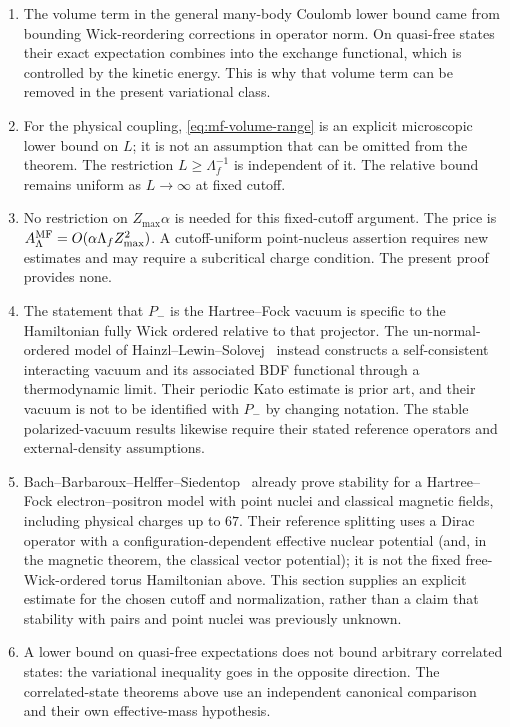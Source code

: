 \begin{remark}
\label{rem:mf-scope}
\begin{enumerate}[label=(\alph*)]
\item The volume term in the general many-body Coulomb lower bound came
from bounding Wick-reordering corrections in operator norm.  On quasi-free
states their exact expectation combines into the exchange functional,
which is controlled by the kinetic energy.  This is why that volume term
can be removed in the present variational class.
\item For the physical coupling, \eqref{eq:mf-volume-range} is an explicit
microscopic lower bound on $L$; it is not an assumption that can be omitted
from the theorem.  The restriction $L\ge\Lambda_f^{-1}$ is independent of
it.  The relative bound remains uniform as $L\to\infty$ at fixed cutoff.
\item No restriction on $Z_{\max}\alpha$ is needed for this fixed-cutoff
argument.  The price is $A^{\rm MF}_\Lambda=O(\alpha\Lambda_fZ_{\max}^2)$.
A cutoff-uniform point-nucleus assertion requires new estimates and may
require a subcritical charge condition.  The present proof provides none.
\item The statement that $P_-$ is the Hartree--Fock vacuum is specific to
the Hamiltonian fully Wick ordered relative to that projector.  The
un-normal-ordered model of Hainzl--Lewin--Solovej~\cite{HLSol2007} instead
constructs a self-consistent interacting vacuum and its associated BDF
functional through a thermodynamic limit.  Their periodic Kato estimate
is prior art, and their vacuum is not to be identified with $P_-$ by
changing notation.  The stable polarized-vacuum results
\cite{HLS2005,HLS2008} likewise require their stated reference operators
and external-density assumptions.
\item Bach--Barbaroux--Helffer--Siedentop~\cite{BBHS1998} already prove
stability for a Hartree--Fock electron--positron model with point nuclei
and classical magnetic fields, including physical charges up to $67$.
Their reference splitting uses a Dirac operator with a configuration-dependent
effective nuclear potential (and, in the magnetic theorem, the classical
vector potential); it is not the fixed free-Wick-ordered torus Hamiltonian above.
This section supplies an explicit estimate for the chosen cutoff and
normalization, rather than a claim that stability with pairs and point
nuclei was previously unknown.
\item A lower bound on quasi-free expectations does not bound arbitrary
correlated states: the variational inequality goes in the opposite
direction. The correlated-state theorems above use an independent
canonical comparison and their own effective-mass hypothesis.
\end{enumerate}
\end{remark}

